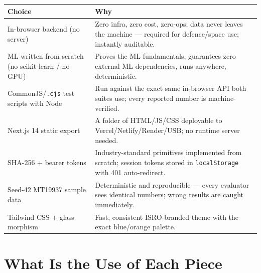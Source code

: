 \documentclass[11pt,a4paper]{article}
\newcommand{\code}[1]{\texttt{\small #1}}
\newcommand{\answerbox}[2]{\par\vspace{0.8em}\noindent
  \begin{tcolorbox}[colback=isroblue!6,colframe=isroblue,
    title={\sffamily\bfseries\color{white}#1},arc=2pt,boxrule=1.2pt]
    #2
  \end{tcolorbox}\par\vspace{0.4em}}
\begin{document}
\answerbox{Every technology decision and the reason}{
  \begin{center}
  \begin{tabular}{@{}ll@{}}
  \toprule
  \textbf{Choice} & \textbf{Why}\\
  \midrule
  In-browser backend (no server) & Zero infra, zero cost, zero-ops; data never leaves the machine
    --- required for defence/space use; instantly auditable.\\
  ML written from scratch (no scikit-learn / no GPU) & Proves the ML fundamentals, guarantees zero
    external ML dependencies, runs anywhere, deterministic.\\
  CommonJS/\code{.cjs} test scripts with Node & Run against the exact same in-browser API both
    suites use; every reported number is machine-verified.\\
  Next.js 14 static export & A folder of HTML/JS/CSS deployable to Vercel/Netlify/Render/USB;
    no runtime server needed.\\
  SHA-256 + bearer tokens & Industry-standard primitives implemented from scratch; session tokens
    stored in \code{localStorage} with 401 auto-redirect.\\
  Seed-42 MT19937 sample data & Deterministic and reproducible --- every evaluator sees identical
    numbers; wrong results are caught immediately.\\
  Tailwind CSS + glass morphism & Fast, consistent ISRO-branded theme with the exact blue/orange
    palette.\\
  \bottomrule
  \end{tabular}
  \end{center}
}

\section{What Is the Use of Each Piece}
\end{document}
